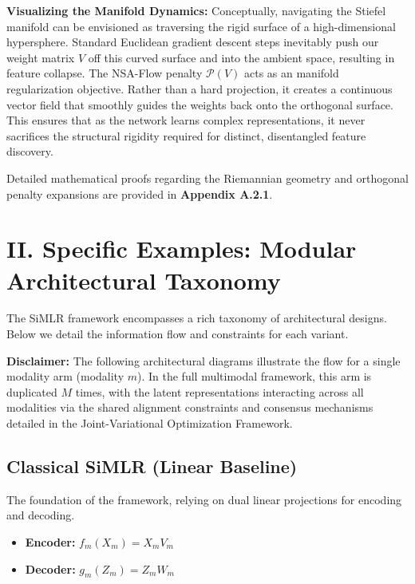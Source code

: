 \documentclass[
  letterpaper,
]{report}
\providecommand{\tightlist}{%
  \setlength{\itemsep}{0pt}\setlength{\parskip}{0pt}}
\begin{document}
\textbf{Visualizing the Manifold Dynamics:} Conceptually, navigating the
Stiefel manifold can be envisioned as traversing the rigid surface of a
high-dimensional hypersphere. Standard Euclidean gradient descent steps
inevitably push our weight matrix \(V\) off this curved surface and into
the ambient space, resulting in feature collapse. The NSA-Flow penalty
\(\mathcal{P}(V)\) acts as an manifold regularization objective. Rather
than a hard projection, it creates a continuous vector field that
smoothly guides the weights back onto the orthogonal surface. This
ensures that as the network learns complex representations, it never
sacrifices the structural rigidity required for distinct, disentangled
feature discovery.

Detailed mathematical proofs regarding the Riemannian geometry and
orthogonal penalty expansions are provided in \textbf{Appendix A.2.1}.

\section{II. Specific Examples: Modular Architectural
Taxonomy}\label{ii.-specific-examples-modular-architectural-taxonomy}

The SiMLR framework encompasses a rich taxonomy of architectural
designs. Below we detail the information flow and constraints for each
variant.

\textbf{Disclaimer:} The following architectural diagrams illustrate the
flow for a single modality arm (modality \(m\)). In the full multimodal
framework, this arm is duplicated \(M\) times, with the latent
representations interacting across all modalities via the shared
alignment constraints and consensus mechanisms detailed in the
Joint-Variational Optimization Framework.

\subsection{Classical SiMLR (Linear
Baseline)}\label{classical-simlr-linear-baseline}

The foundation of the framework, relying on dual linear projections for
encoding and decoding.

\begin{itemize}
\tightlist
\item
  \textbf{Encoder:} \(f_m(X_m) = X_m V_m\)
\item
  \textbf{Decoder:} \(g_m(Z_m) = Z_m W_m\)
\end{itemize}
\end{document}
